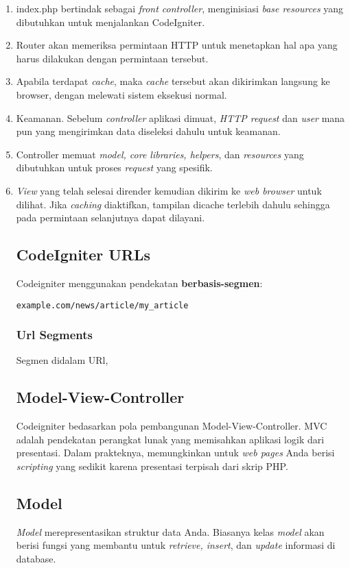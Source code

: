 \begin{enumerate}
\item index.php bertindak sebagai \textit{front controller}, menginisiasi \textit{base resources} yang dibutuhkan untuk menjalankan CodeIgniter.
\item Router akan memeriksa permintaan HTTP untuk menetapkan hal apa yang harus dilakukan dengan permintaan tersebut.
\item Apabila terdapat \textit{cache}, maka \textit{cache} tersebut akan dikirimkan langsung ke browser, dengan melewati sistem eksekusi normal.
\item Keamanan. Sebelum \textit{controller} aplikasi dimuat, \textit{HTTP request} dan \textit{user} mana pun yang mengirimkan data diseleksi dahulu untuk keamanan.
\item Controller memuat \textit{model, core libraries, helpers}, dan \textit{resources} yang dibutuhkan untuk proses \textit{request} yang spesifik.
\item \textit{View} yang telah selesai dirender kemudian dikirim ke \textit{web browser} untuk dilihat. Jika \textit{caching} diaktifkan, tampilan dicache terlebih dahulu sehingga pada permintaan selanjutnya dapat dilayani.

\subsection{CodeIgniter URLs}
\label{subs:urls}
Codeigniter menggunakan pendekatan \textbf{berbasis-segmen}:
\begin{lstlisting}[frame=single] 
example.com/news/article/my_article
\end{lstlisting}

\subsubsection{Url Segments}
\label{sssec:url_1}
Segmen didalam URl, 

\subsection{Model-View-Controller}
\label{subs:mvc}
Codeigniter bedasarkan pola pembangunan Model-View-Controller. MVC adalah pendekatan perangkat lunak yang memisahkan aplikasi logik dari presentasi. Dalam prakteknya, memungkinkan untuk \textit{web pages} Anda berisi \textit{scripting} yang sedikit karena presentasi terpisah dari skrip PHP.

\subsection{Model}
\label{subs:model}
\textit{Model} merepresentasikan struktur data Anda. Biasanya kelas \textit {model} akan berisi fungsi yang membantu untuk \textit{retrieve, insert}, dan \textit{update} informasi di database.


\end{enumerate}
